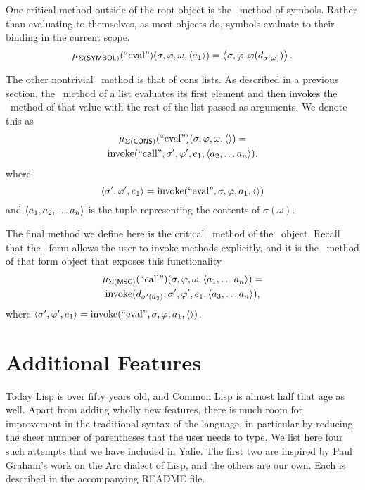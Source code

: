 \documentclass[twocolumn]{article}
\begin{document}
One critical method outside of the root object is the \eval\ method of
symbols. Rather than evaluating to themselves, as most objects do,
symbols evaluate to their binding in the current scope.
\[  \mu_{\Sigma(\mathsf{SYMBOL})}(\text{``eval''})(\sigma,\varphi,\omega,
\left< a_1\right>) = \left< \sigma, \varphi, \varphi(d_{\sigma(\omega)})\right>.\]

The other nontrivial \eval\ method is that of cons lists. As described
in a previous section, the \eval\ method of a list evaluates its first
element and then invokes the \call\ method of that value with the rest
of the list passed as arguments. We denote this as
\begin{multline*}
\mu_{\Sigma(\mathsf{CONS})}(\text{``eval''})(\sigma,\varphi,\omega,
\left<\right>) = \\\operatorname{invoke}(\text{``call''},\sigma',\varphi',e_1,\left< a_2,\ldots
a_n\right>).
\end{multline*}
where 
\[ \left< \sigma',\varphi',e_1\right> =
\operatorname{invoke}(\text{``eval''},\sigma,\varphi,a_1,\left<\right>) \]
and $\left< a_1,a_2,\ldots a_n\right>$ is the tuple representing the
contents of $\sigma(\omega)$.

The final method we define here is the critical \call\ method of the
\msg\ object. Recall that the \msg\ form allows the user to invoke
methods explicitly, and it is the \call\ method of that form object
that exposes this functionality
\begin{multline*}
  \mu_{\Sigma(\mathsf{MSG})}(\text{``call''})(\sigma,\varphi,\omega,
  \left< a_1,\ldots a_n \right>) = \\\operatorname{invoke}( d_{\sigma'(a_2)}, \sigma', \varphi', e_1,
  \left< a_3,\ldots a_n \right>),
\end{multline*}
where $\left< \sigma', \varphi', e_1\right> =
\operatorname{invoke}(\text{``eval''},\sigma,\varphi,a_1,\left<\right>)$.

\section*{Additional Features}
Today Lisp is over fifty years old, and Common Lisp is almost half
that age as well. Apart from adding wholly new features, there is much
room for improvement in the traditional syntax of the language, in
particular by reducing the sheer number of parentheses that the user
needs to type. We list here four such attempts that we have included
in Yalie. The first two are inspired by Paul Graham's work on the Arc
dialect of Lisp\cite{Graham}, and the others are our own. Each is
described in the accompanying README file.
\end{document}
